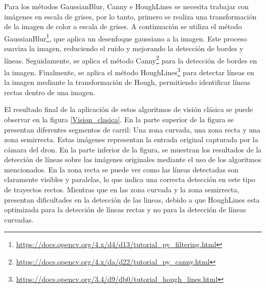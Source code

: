 Para los métodos GaussianBlur, Canny e HoughLines se necesita trabajar con imágenes en escala de grises, por lo tanto, primero se realiza una transformación de la imagen 
de color a escala de grises. A continuación se utiliza el método GaussianBlur\footnote{\url{https://docs.opencv.org/4.x/d4/d13/tutorial_py_filtering.html}}, que aplica un desenfoque 
gaussiano a la imagen. Este proceso suaviza la imagen, reduciendo el ruido y mejorando la detección de bordes y líneas. Seguidamente, se aplica el método Canny\footnote{\url{https://docs.opencv.org/4.x/da/d22/tutorial_py_canny.html}} 
para la detección de bordes en la imagen. Finalmente, se aplica el método HoughLines\footnote{\url{https://docs.opencv.org/3.4/d9/db0/tutorial_hough_lines.html}} 
para detectar líneas en la imagen mediante la transformación de Hough, permitiendo identificar líneas rectas dentro de una imagen. 

El resultado final de la aplicación de estos algoritmos de visión clásica se puede observar en la figura \ref{Vision_clasica}. En la parte superior de la figura se presentan diferentes segmentos
de carril: Una zona curvada, una zona recta y una zona semirrecta. Estas imágenes representan la entrada original capturada por la cámara del dron. En la parte inferior de la figura, 
se muestran los resultados de la detección de líneas sobre las imágenes originales mediante el uso de los algoritmos mencionados. En la zona recta se puede ver como las líneas
detectadas son claramente visibles y paralelas, lo que indica una correcta detección en este tipo de trayectos rectos. Mientras que en las zona curvada y la zona semirrecta, presentan
dificultades en la detección de las lineas, debido a que HoughLines esta optimizada para la detección de líneas rectas y no para la detección de líneas curvadas. 

